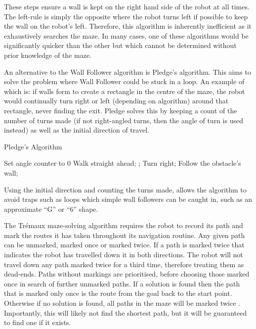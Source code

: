 These steps ensure a wall is kept on the right hand side of the robot at
all times. The left-rule is simply the opposite where the robot turns left
if possible to keep the wall on the robot's left. Therefore,
this algorithm is inherently inefficient as it exhaustively searches the
maze. In many cases, one of these algorithms would be significantly quicker
than the other but which cannot be determined without prior knowledge of
the maze.

An alternative to the Wall Follower algorithm is Pledge's algorithm. This
aims to solve the problem where Wall Follower could be stuck in a loop. An
example of which is: if walls form to create a rectangle in the centre of
the maze, the robot would continually turn right or left (depending on
algorithm) around that rectangle, never finding the exit. Pledge solves this
by keeping a count of the number of turns made (if not right-angled turns,
then the angle of turn is used instead) as well as the initial direction of
travel. \cite{klein2011pledge}

\begin{algorithm}
\caption{Pledge's Algorithm}
\begin{algorithmic}
\STATE Set angle counter to 0
\REPEAT
\REPEAT
\STATE Walk straight ahead;
;
\STATE Turn right;
\REPEAT
\STATE Follow the obstacle's wall;
\end{algorithmic}
\end{algorithm}

Using the initial direction and counting the turns made, allows the
algorithm to avoid traps such as loops which simple wall followers can be caught in, such as an approximate ``G'' or ``6'' shape.

The Trémaux maze-solving algorithm requires the robot to record its
path and mark the routes it has taken throughout its navigation routine. Any
given path can be unmarked, marked once or marked twice. If a path is marked
twice that indicates the robot has travelled down it in both directions. The
robot will not travel down any path marked twice for a third time, therefore
treating them as dead-ends. Paths without markings are prioritised, before
choosing those marked once in search of further unmarked paths. If a
solution is found then the path that is marked only once is the route
from the goal back to the start point. Otherwise if no solution is found,
all paths in the maze will be marked twice \cite{even2011graph}.
Importantly, this will likely not find the shortest path, but it will be
guaranteed to find one if it exists.

